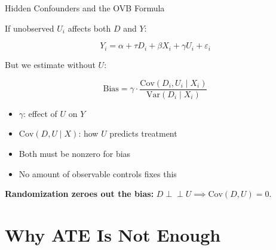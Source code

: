 \documentclass[aspectratio=169, 11pt, handout]{beamer}
\newcommand{\Var}{\mathrm{Var}}
\newcommand{\Cov}{\mathrm{Cov}}
\newcommand{\indep}{\perp\!\!\!\perp}
\begin{document}
\begin{frame}{Hidden Confounders and the OVB Formula}

If unobserved $U_i$ affects both $D$ and $Y$:

\[
Y_i = \alpha + \tau D_i + \beta X_i + \gamma U_i + \varepsilon_i
\]

But we estimate without $U$:

\[
\text{Bias} = \gamma \cdot \frac{\Cov(D_i, U_i \mid X_i)}{\Var(D_i \mid X_i)}
\]

\bigskip

\begin{itemize}
    \item $\gamma$: effect of $U$ on $Y$
    \item $\Cov(D, U \mid X)$: how $U$ predicts treatment
    \item Both must be nonzero for bias
    \item No amount of observable controls fixes this
\end{itemize}

\bigskip

\textbf{Randomization zeroes out the bias:} $D \indep U \implies \Cov(D, U) = 0$.
\end{frame}

\section{Why ATE Is Not Enough}
\end{document}

